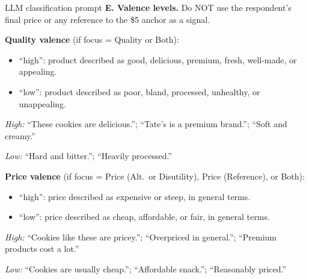 \documentclass[10pt]{beamer}   %
\begin{document}
\begin{frame}{LLM classification prompt}
\small
\textbf{E. Valence levels.}
Do NOT use the respondent's final price or any reference to the \$5 anchor as a signal.
\medskip

\textbf{Quality valence} (if focus = Quality or Both):
\begin{itemize}
\item ``high'': product described as good, delicious, premium, fresh, well-made, or appealing.
\item ``low'': product described as poor, bland, processed, unhealthy, or unappealing.
\end{itemize}
\medskip
\vspace{-1em}

\emph{High:} ``These cookies are delicious.''; ``Tate's is a premium brand.''; ``Soft and creamy.'' 
\medskip

\emph{Low:} ``Hard and bitter.''; ``Heavily processed.''

\vspace{6pt}
\textbf{Price valence} (if focus = Price (Alt.\ or Disutility), Price (Reference), or Both):
\vspace{-1em}
\begin{itemize}
\item ``high'': price described as expensive or steep, in general terms.
\item ``low'': price described as cheap, affordable, or fair, in general terms.
\end{itemize}
\emph{High:} ``Cookies like these are pricey.''; ``Overpriced in general.''; ``Premium products cost a lot.'' 

\medskip
\emph{Low:} ``Cookies are usually cheap.''; ``Affordable snack.''; ``Reasonably priced.''
\end{frame}
\end{document}

